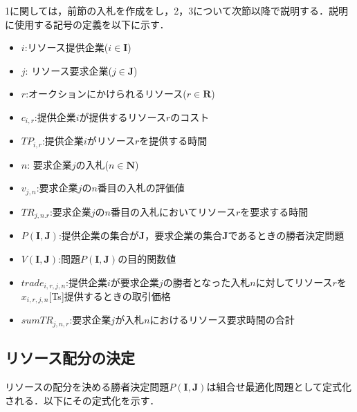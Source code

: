 1に関しては，前節の入札を作成をし，2，3について次節以降で説明する．説明に使用する記号の定義を以下に示す．

\begin{itemize}
\tightlist
\item
  \(i\):リソース提供企業(\(i \in \boldsymbol{I}\))
\item
  \(j\): リソース要求企業(\(j \in \boldsymbol{J}\))
\item
  \(r\):オークションにかけられるリソース(\(r \in \boldsymbol{R}\))
\item
  \(c_{i,r}\):提供企業\(i\)が提供するリソース\(r\)のコスト
\item
  \(TP_{i,r}\):提供企業\(i\)がリソース\(r\)を提供する時間
\item
  \(n\): 要求企業\(j\)の入札(\(n \in \boldsymbol{N}\))
\item
  \(v_{j,n}\):要求企業\(j\)の\(n\)番目の入札の評価値
\item
  \(TR_{j,n.r}\):要求企業\(j\)の\(n\)番目の入札においてリソース\(r\)を要求する時間
\item
  \(P(\boldsymbol{I},\boldsymbol{J})\):提供企業の集合が\(\boldsymbol{J}\)，要求企業の集合\(\boldsymbol{J}\)であるときの勝者決定問題
\item
  \(V(\boldsymbol{I},\boldsymbol{J})\):問題\(P(\boldsymbol{I},\boldsymbol{J})\)の目的関数値
\item
  \(trade_{i,r,j,n}\):提供企業\(i\)が要求企業\(j\)の勝者となった入札\(n\)に対してリソース\(r\)を\(x_{i,r,j,n}\){[}Ts{]}提供するときの取引価格
\item
  \(sumTR_{j,n,r}\):要求企業\(j\)が入札\(n\)におけるリソース要求時間の合計
\end{itemize}

\hypertarget{ux30eaux30bdux30fcux30b9ux914dux5206ux306eux6c7aux5b9a}{%
\subsection{\texorpdfstring{リソース配分の決定
\label{method1-resorce}}{リソース配分の決定 }}\label{ux30eaux30bdux30fcux30b9ux914dux5206ux306eux6c7aux5b9a}}

リソースの配分を決める勝者決定問題\(P(\boldsymbol{I},\boldsymbol{J})\)は組合せ最適化問題として定式化される．以下にその定式化を示す．

